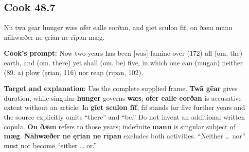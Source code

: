 \par\begin{minipage}{\linewidth}\raggedright
\subsection*{Cook 48.7}

Nū twā gēar hunger wæs ofer ealle eorðan, and gīet sculon fīf, on ðǣm mann nāhwæðer ne ęrian ne rīpan mæg.

\textbf{Cook’s prompt:} Now two years has been [was] famine over (172) all (om. the) earth, and (om. there) yet shall (om. be) five, in which one can (mugan) neither (89. a) plow (ęrian, 116) nor reap (rīpan, 102).

\textbf{Target and explanation:} Use the complete supplied frame. \textbf{Twā gēar} gives duration, while singular \textbf{hunger} governs \textbf{wæs}; \textbf{ofer ealle eorðan} is accusative extent without an article. In \textbf{gīet sculon fīf}, fīf stands for five further years and the source explicitly omits “there” and “be.” Do not invent an additional written copula. \textbf{On ðǣm} refers to those years; indefinite \textbf{mann} is singular subject of \textbf{mæg}. \textbf{Nāhwæðer ne ęrian ne rīpan} excludes both activities. “Neither … nor” must not become “either … or.”

\end{minipage}\par\addvspace{4pt}

